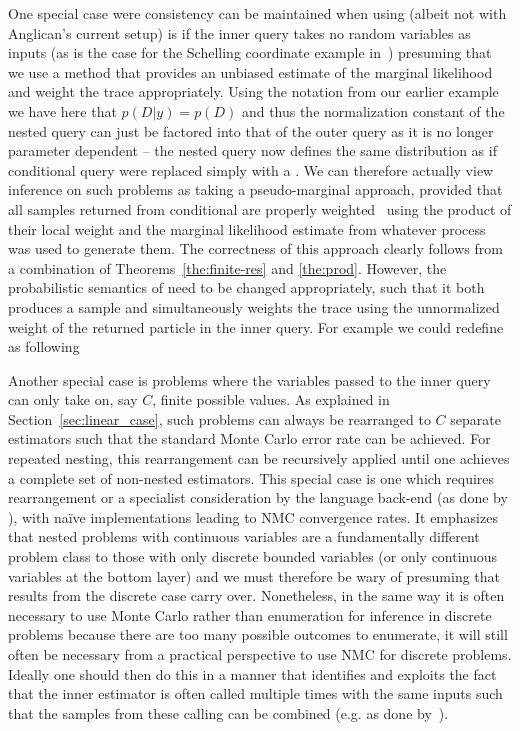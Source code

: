 One special case were consistency can be maintained when using \conditional (albeit not with Anglican's current
setup) is if the inner query takes no random variables as inputs (as is the case for
the Schelling coordinate example in~\cite[Figure 6]{stuhlmuller2014reasoning}) presuming that
we use a method that provides an unbiased estimate of the marginal likelihood and weight the trace appropriately.  Using the notation
from our earlier example we have here that $p(D|y)=p(D)$ and thus the normalization constant
of the nested query can just be factored into that of the outer query as it is no longer parameter
dependent -- the nested query now defines the same distribution as if conditional query were replaced
simply with a .  We can therefore actually view inference on such problems as taking a pseudo-marginal approach, provided
that all samples returned from conditional are properly weighted~\cite{naessethLS2015nested} using the
product of their local weight and the marginal likelihood estimate from whatever process was used to generate them.
The correctness of this approach clearly follows from a combination of Theorems~\ref{the:finite-res} and \ref{the:prod}.
However, the probabilistic semantics of \conditional need to be changed appropriately, such that it
both produces a sample and simultaneously weights the trace using the unnormalized weight of the returned
particle in the inner query.  For example we could redefine \conditional as following

Another special case is problems where the variables passed to the inner query can only take on, say $C$, finite
possible values. As
explained in Section~\ref{sec:linear_case}, such problems can always be rearranged to
$C$ separate estimators such that the standard Monte Carlo error rate can be achieved.
For repeated nesting, this rearrangement can be recursively applied until one achieves
a complete set of non-nested estimators.  This special case is one which requires rearrangement
or a specialist consideration by the language back-end (as done by \cite{stuhlmuller2012dynamic,stuhlmuller2014reasoning,cornish2017efficient}),
with na\"{i}ve implementations leading to NMC convergence rates.  It emphasizes that
nested problems with continuous variables are a fundamentally different problem
class to those with only discrete bounded variables (or only continuous variables at the bottom layer)
and we must therefore be wary of presuming that results from the discrete case carry over.
Nonetheless, in the same way it is often necessary to use Monte Carlo rather than enumeration
for inference in discrete problems because there are too many possible outcomes to enumerate, 
it will still often be necessary from a practical perspective
to use NMC for discrete problems. Ideally one should then do this in a manner that identifies and exploits the fact that
the inner estimator is often called multiple times with the same inputs such that the samples
from these calling can be combined (e.g. as done by~\cite{stuhlmuller2012dynamic}).

